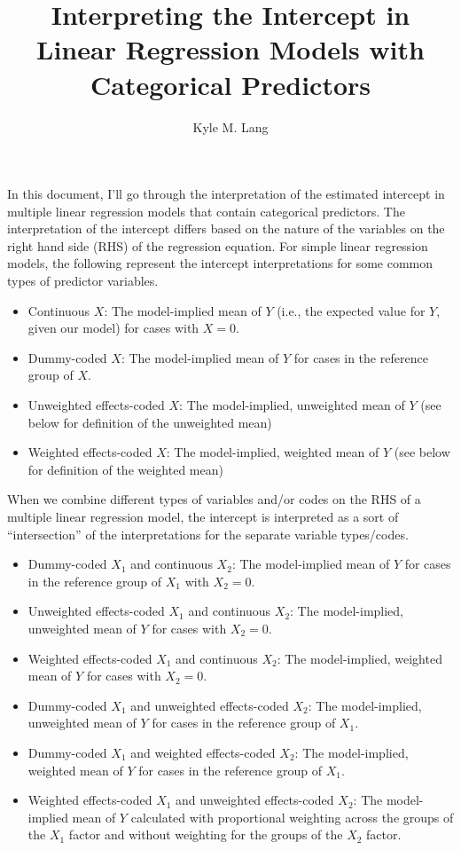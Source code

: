 \documentclass{article}\usepackage[]{graphicx}\usepackage[]{color}
\title{Interpreting the Intercept in Linear Regression Models with Categorical Predictors}
\author{Kyle M. Lang}
\begin{document}
\maketitle

In this document, I'll go through the interpretation of the estimated intercept
in multiple linear regression models that contain categorical predictors. The
interpretation of the intercept differs based on the nature of the variables on
the right hand side (RHS) of the regression equation. For simple linear
regression models, the following represent the intercept interpretations for
some common types of predictor variables.

\begin{itemize}
\item Continuous $X$: The model-implied mean of $Y$ (i.e., the expected value
  for $Y$, given our model) for cases with $X = 0$.
\item Dummy-coded $X$: The model-implied mean of $Y$ for cases in the reference
  group of $X$.
\item Unweighted effects-coded $X$: The model-implied, unweighted mean of $Y$
  (see below for definition of the unweighted mean)
\item Weighted effects-coded $X$: The model-implied, weighted mean of $Y$
  (see below for definition of the weighted mean)
\end{itemize}

When we combine different types of variables and/or codes on the RHS of a
multiple linear regression model, the intercept is interpreted as a sort of
``intersection'' of the interpretations for the separate variable types/codes.

\begin{itemize}
\item Dummy-coded $X_1$ and continuous $X_2$: The model-implied mean of $Y$ for
  cases in the reference group of $X_1$ with $X_2 = 0$.
\item Unweighted effects-coded $X_1$ and continuous $X_2$: The model-implied,
  unweighted mean of $Y$ for cases with $X_2 = 0$.
\item Weighted effects-coded $X_1$ and continuous $X_2$: The model-implied,
  weighted mean of $Y$ for cases with $X_2 = 0$.
\item Dummy-coded $X_1$ and unweighted effects-coded $X_2$: The model-implied,
  unweighted mean of $Y$ for cases in the reference group of $X_1$.
\item Dummy-coded $X_1$ and weighted effects-coded $X_2$: The model-implied,
  weighted mean of $Y$ for cases in the reference group of $X_1$.
\item Weighted effects-coded $X_1$ and unweighted effects-coded $X_2$: The
  model-implied mean of $Y$ calculated with proportional weighting across the
  groups of the $X_1$ factor and without weighting for the groups of the $X_2$
  factor.
\end{itemize}
\end{document}
